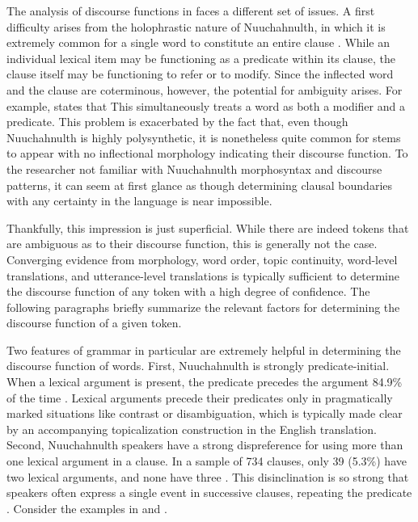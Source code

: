 The analysis of discourse functions in  faces a different set of issues. A first difficulty arises from the holophrastic nature of Nuuchahnulth, in which it is extremely common for a single word to constitute an entire clause . While an individual lexical item may be functioning as a predicate within its clause, the clause itself may be functioning to refer or to modify. Since the inflected word and the clause are coterminous, however, the potential for ambiguity arises. For example, \textcite[113]{Nakayama2001} states that  This simultaneously treats a word as both a modifier and a predicate. This problem is exacerbated by the fact that, even though Nuuchahnulth is highly polysynthetic, it is nonetheless quite common for stems to appear with no inflectional morphology indicating their discourse function. To the researcher not familiar with Nuuchahnulth morphosyntax and discourse patterns, it can seem at first glance as though determining clausal boundaries with any certainty in the language is near impossible.

Thankfully, this impression is just superficial. While there are indeed tokens that are ambiguous as to their discourse function, this is generally not the case. Converging evidence from morphology, word order, topic continuity, word-level translations, and utterance-level translations is typically sufficient to determine the discourse function of any token with a high degree of confidence. The following paragraphs briefly summarize the relevant factors for determining the discourse function of a given token.

Two features of  grammar in particular are extremely helpful in determining the discourse function of words. First, Nuuchahnulth is strongly predicate-initial. When a lexical argument is present, the predicate precedes the argument 84.9\% of the time \parencite[149]{Nakayama2001}. Lexical arguments precede their predicates only in pragmatically marked situations like contrast or disambiguation, which is typically made clear by an accompanying topicalization construction in the English translation. Second, Nuuchahnulth speakers have a strong dispreference for using more than one lexical argument in a clause. In a sample of 734 clauses, only 39 (5.3\%) have two lexical arguments, and none have three \parencite[149]{Nakayama2001}. This disinclination is so strong that speakers often express a single event in successive clauses, repeating the predicate \parencite[75]{Nakayama2001}. Consider the examples in  and .

